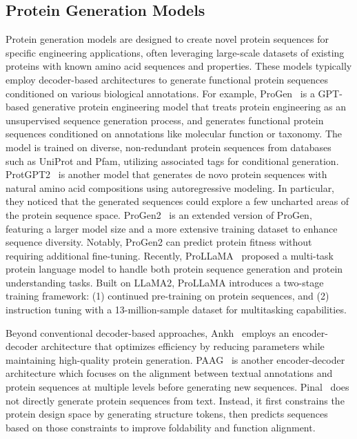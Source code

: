 \subsection{Protein Generation Models}

Protein generation models are designed to create novel protein sequences for specific engineering applications, often leveraging large-scale datasets of existing proteins with known amino acid sequences and properties. These models typically employ decoder-based architectures to generate functional protein sequences conditioned on various biological annotations. For example, ProGen~\cite{madani2023large} is a GPT-based generative protein engineering model that treats protein engineering as an unsupervised sequence generation process, and generates functional protein sequences conditioned on annotations like molecular function or taxonomy. The model is trained on diverse, non-redundant protein sequences from databases such as UniProt and Pfam, utilizing associated tags for conditional generation. ProtGPT2~\cite{ferruz2022protgpt2} is another model that generates de novo protein sequences with natural amino acid compositions using autoregressive modeling. In particular, they noticed that the generated sequences could explore a few uncharted areas of the protein sequence space. 
ProGen2~\cite{nijkamp2023progen2} is an extended version of ProGen, featuring a larger model size and a more extensive training dataset to enhance sequence diversity.  
Notably, ProGen2 can predict protein fitness without requiring additional fine-tuning. Recently, ProLLaMA~\citep{lv2024prollama} proposed a multi-task protein language model to handle both protein sequence generation and protein understanding tasks. Built on LLaMA2, ProLLaMA introduces a two-stage training framework: (1) continued pre-training on protein sequences, and (2) instruction tuning with a 13-million-sample dataset for multitasking capabilities.

Beyond conventional decoder-based approaches, Ankh~\citep{elnaggar2023ankhoptimizedproteinlanguage} employs an encoder-decoder architecture that optimizes efficiency by reducing parameters while maintaining high-quality protein generation. PAAG~\citep{yuan2024annotation} is another encoder-decoder architecture which focuses on the alignment between textual annotations and protein sequences at multiple levels before generating new sequences.  
Pinal~\citep{dai2024toward} does not directly generate protein sequences from text. Instead, it first constrains the protein design space by generating structure tokens, then predicts sequences based on those constraints to improve foldability and function alignment.


